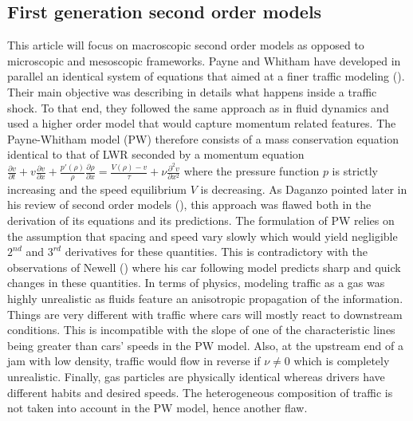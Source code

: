 \documentclass[preprint]{elsarticle}
\begin{document}
\subsection{First generation second order models}
This article will focus on macroscopic second order models as opposed
to microscopic and mesoscopic frameworks. Payne and Whitham have developed
in parallel an identical system of equations that aimed at a finer
traffic modeling (\cite{payne1971models,whitham1974linear}). Their
main objective was describing in details what happens inside a traffic shock.
To that end, they followed the same approach as in fluid dynamics
and used a higher order model that would capture momentum related
features. The Payne-Whitham model (PW) therefore consists of a mass
conservation equation identical to that of LWR seconded by a momentum
equation $\frac{\partial v}{\partial t}+v\frac{\partial v}{\partial x}+\frac{p'\left(\rho\right)}{\rho}\frac{\partial\rho}{\partial x}=\frac{V\left(\rho\right)-v}{\tau}+\nu\frac{\partial^{2}v}{\partial x^{2}}$
where the pressure function $p$ is strictly increasing and the speed
equilibrium $V$ is decreasing. As Daganzo pointed later in his review
of second order models (\cite{Dag_requiem}), this approach was flawed
both in the derivation of its equations and its predictions. The formulation
of PW relies on the assumption that spacing and speed vary slowly
which would yield negligible $2^{nd}$ and $3^{rd}$ derivatives for
these quantities. This is contradictory with the observations of Newell
(\cite{Newel}) where his car following model predicts sharp and quick
changes in these quantities. In terms of physics, modeling traffic
as a gas was highly unrealistic as fluids feature an anisotropic
propagation of the information. Things are very different with traffic
where cars will mostly react to downstream conditions. This is incompatible
with the slope of one of the characteristic lines being greater than
cars' speeds in the PW model. Also, at the upstream end of a jam with
low density, traffic would flow in reverse if $\nu\neq0$ which is
completely unrealistic. Finally, gas particles are physically identical
whereas drivers have different habits and desired speeds. The heterogeneous
composition of traffic is not taken into account in the PW model,
hence another flaw.
\end{document}
